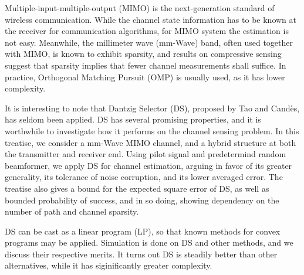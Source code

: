 
\starttitle [title={Abstract}]

Multiple-input-multiple-output (MIMO) is the next-generation standard of wireless communication.
While the channel state information has to be known at the receiver for communication algorithms, for MIMO system the estimation is not easy.
Meanwhile, the millimeter wave (mm-Wave) band, often used together with MIMO, is known to exhibit sparsity, and results on compressive sensing suggest that sparsity implies that fewer channel measurements shall suffice.
In practice, Orthogonal Matching Pursuit (OMP) is usually used, as it has lower complexity.

It is interesting to note that Dantzig Selector (DS), proposed by Tao and Candès, has seldom been applied.
DS has several promising properties, and it is worthwhile to investigate how it performs on the channel sensing problem.
In this treatise, we consider a mm-Wave MIMO channel, and a hybrid structure at both the transmitter and receiver end.
Using pilot signal and predetermind random beamformer, we apply DS for channel estimation, arguing in favor of its greater generality, its tolerance of noise corruption, and its lower averaged error.
The treatise also gives a bound for the expected square error of DS, as well as bounded probability of success, and in so doing, showing dependency on the number of path and channel sparsity.

DS can be cast as a linear program (LP), so that known methods for convex programs may be applied.
Simulation is done on DS and other methods, and we discuss their respective merits.
It turns out DS is steadily better than other alternatives, while it has siginificantly greater complexity.


\stoptitle
